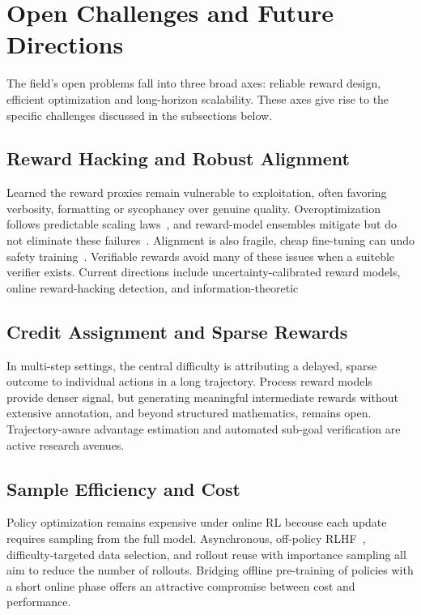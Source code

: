 \section{Open Challenges and Future Directions}\label{sec:challenges}

The field's open problems fall into three broad axes: reliable reward design, efficient optimization and long-horizon scalability. These axes give rise to the specific challenges  discussed in the subsections below.

\subsection{Reward Hacking and Robust Alignment}

Learned the reward proxies remain vulnerable to exploitation, often favoring verbosity, formatting or sycophancy over genuine quality. 
Overoptimization follows predictable scaling laws~\cite{gao2023scaling}, and reward-model ensembles mitigate but do not eliminate these failures~\cite{coste2024ensembles}. Alignment is also fragile, cheap fine-tuning can undo safety training~\cite{qi2024finetuning,lermen2024lora}.
Verifiable rewards avoid many of these issues when a suiteble verifier exists. Current directions include uncertainty-calibrated reward
models, online reward-hacking detection, and information-theoretic

\subsection{Credit Assignment and Sparse Rewards}

In multi-step settings, the central difficulty is attributing a delayed,
sparse outcome to individual actions in a long trajectory. Process reward
models~\cite{lightman2023verify,wang2024omegaprm} provide denser signal,
but generating meaningful intermediate rewards without extensive
annotation, and beyond structured mathematics, remains open.
Trajectory-aware advantage estimation and automated sub-goal verification
are active research avenues.

\subsection{Sample Efficiency and Cost}

Policy optimization remains expensive under online RL becouse each update requires sampling from the full model.
Asynchronous, off-policy RLHF~\cite{noukhovitch2025async}, difficulty-targeted data selection, and rollout reuse with importance sampling all aim to reduce the number of rollouts. Bridging offline pre-training of policies with a short online
phase offers an attractive compromise between cost and performance.

